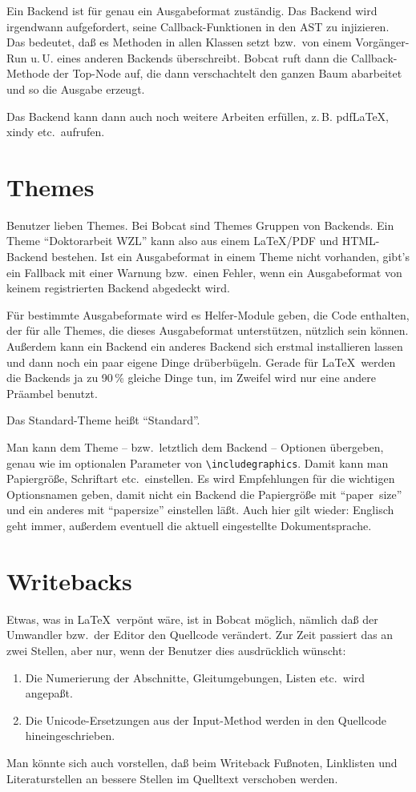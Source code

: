 \documentclass[12pt,openany]{book}
\begin{document}
Ein Backend ist für genau ein Ausgabeformat zuständig.  Das Backend wird
irgendwann aufgefordert, seine Callback-Funktionen in den AST zu injizieren.
Das bedeutet, daß es Methoden in allen Klassen setzt bzw.\ von einem
Vorgänger-Run u.\,U. eines anderen Backends überschreibt.  Bobcat ruft dann die
Callback-Methode der Top-Node auf, die dann verschachtelt den ganzen Baum
abarbeitet und so die Ausgabe erzeugt.

Das Backend kann dann auch noch weitere Arbeiten erfüllen, z.\,B. pdfLaTeX,
xindy etc.\ aufrufen.


\section{Themes}

Benutzer lieben Themes.  Bei Bobcat sind Themes Gruppen von Backends.  Ein Theme
"`Doktorarbeit WZL"' kann also aus einem \LaTeX/PDF und HTML-Backend bestehen.
Ist ein Ausgabeformat in einem Theme nicht vorhanden, gibt's ein Fallback mit
einer Warnung bzw.\ einen Fehler, wenn ein Ausgabeformat von keinem
registrierten Backend abgedeckt wird.

Für bestimmte Ausgabeformate wird es Helfer-Module geben, die Code enthalten,
der für alle Themes, die dieses Ausgabeformat unterstützen, nützlich sein
können.  Außerdem kann ein Backend ein anderes Backend sich erstmal
installieren lassen und dann noch ein paar eigene Dinge drüberbügeln.  Gerade
für \LaTeX\ werden die Backends ja zu 90\,\% gleiche Dinge tun, im Zweifel wird
nur eine andere Präambel benutzt.

Das Standard-Theme heißt "`Standard"'.

Man kann dem Theme -- bzw.\ letztlich dem Backend -- Optionen übergeben, genau
wie im optionalen Parameter von \verb|\includegraphics|.  Damit kann man
Papiergröße, Schriftart etc.\ einstellen.  Es wird Empfehlungen für die
wichtigen Optionsnamen geben, damit nicht ein Backend die Papiergröße mit
"`paper~size"' und ein anderes mit "`papersize"' einstellen läßt.  Auch hier
gilt wieder: Englisch geht immer, außerdem eventuell die aktuell eingestellte
Dokumentsprache.

\section{Writebacks}

Etwas, was in \LaTeX\ verpönt wäre, ist in Bobcat möglich, nämlich daß der
Umwandler bzw.\ der Editor den Quellcode verändert.  Zur Zeit passiert das an
zwei Stellen, aber nur, wenn der Benutzer dies ausdrücklich wünscht:

\begin{enumerate}
\item Die Numerierung der Abschnitte, Gleitumgebungen, Listen etc.\ wird
  angepaßt.
\item Die Unicode-Ersetzungen aus der Input-Method werden in den Quellcode
  hineingeschrieben.
\end{enumerate}

Man könnte sich auch vorstellen, daß beim Writeback Fußnoten, Linklisten und
Literaturstellen an bessere Stellen im Quelltext verschoben werden.
\end{document}
